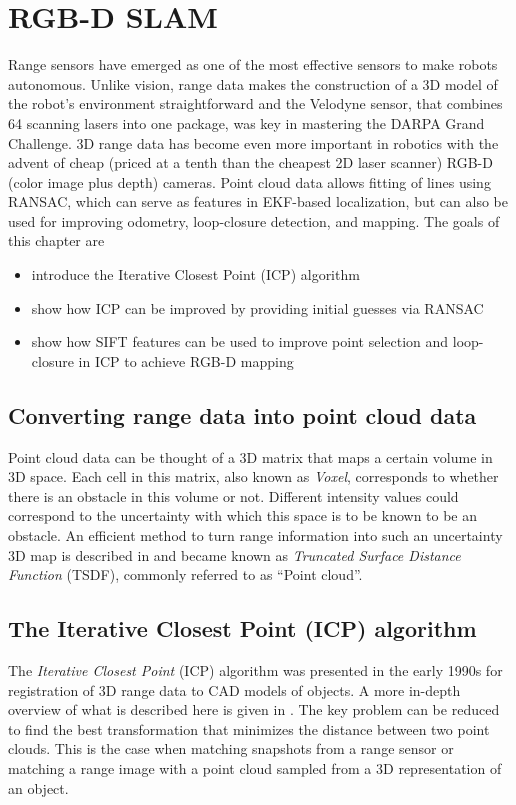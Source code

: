 \documentclass[paper=6.14in:9.21in,pagesize=pdftex,11pt,twoside,openright]{scrbook}
\begin{document}
\chapter{RGB-D SLAM}
 Range sensors have emerged as one of the most effective sensors to make robots autonomous. Unlike vision, range data makes the construction of a 3D model of the robot's environment straightforward and the Velodyne sensor, that combines 64 scanning lasers into one package, was key in mastering the DARPA Grand Challenge.  3D range data has become even more important in robotics with the advent of cheap (priced at a tenth than the cheapest 2D laser scanner) RGB-D (color image plus depth) cameras. Point cloud data allows fitting of lines using RANSAC, which can serve as features in EKF-based localization, but can also be used for improving odometry, loop-closure detection, and mapping. The goals of this chapter are
\begin{itemize}
\item introduce the Iterative Closest Point (ICP) algorithm
\item show how ICP can be improved by providing initial guesses via RANSAC
\item show how SIFT features can be used to improve point selection and loop-closure in ICP to achieve RGB-D mapping
\end{itemize}

\section{Converting range data into point cloud data}
Point cloud data can be thought of a 3D matrix that maps a certain volume in 3D space. Each cell in this matrix, also known as \emph{Voxel}, corresponds to whether there is an obstacle in this volume or not. Different intensity values could correspond to the uncertainty with which this space is to be known to be an obstacle. An efficient method to turn range information into such an uncertainty 3D map is described in \cite{curless96} and became known as \emph{Truncated Surface Distance Function} (TSDF), commonly referred to as ``Point cloud''.

\section{The Iterative Closest Point (ICP) algorithm}
The \emph{Iterative Closest Point} (ICP) algorithm was presented in the early 1990s for registration of 3D range data to CAD models of objects. A more in-depth overview of what is described here is given in \cite{rusinkiewicz01}. The key problem can be reduced to find the best transformation that minimizes the distance between two point clouds. This is the case when matching snapshots from a range sensor or matching a range image with a point cloud sampled from a 3D representation of an object.
\end{document}
